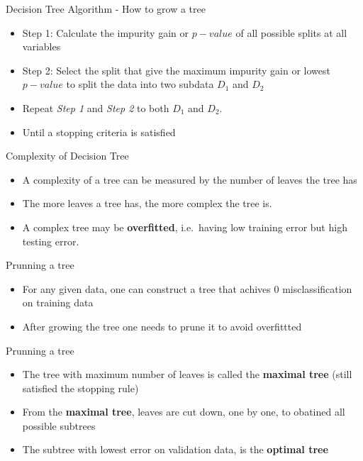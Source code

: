 \documentclass[
  ignorenonframetext,
]{beamer}
\providecommand{\tightlist}{%
  \setlength{\itemsep}{0pt}\setlength{\parskip}{0pt}}\usepackage{longtable,booktabs,array}
\begin{document}
\begin{frame}{Decision Tree Algorithm - How to grow a tree}
\label{decision-tree-algorithm---how-to-grow-a-tree}
\begin{itemize}
\tightlist
\item
  Step 1: Calculate the impurity gain or \(p-value\) of all possible
  splits at all variables
\item
  Step 2: Select the split that give the maximum impurity gain or lowest
  \(p-value\) to split the data into two subdata \(D_1\) and \(D_2\)
\item
  Repeat \emph{Step 1} and \emph{Step 2} to both \(D_1\) and \(D_2\).
\item
  Until a stopping criteria is satisfied
\end{itemize}
\end{frame}

\begin{frame}{Complexity of Decision Tree}
\label{complexity-of-decision-tree}
\begin{itemize}
\tightlist
\item
  A complexity of a tree can be measured by the number of leaves the
  tree has
\item
  The more leaves a tree has, the more complex the tree is.
\item
  A complex tree may be \textbf{overfitted}, i.e.~having low training
  error but high testing error.
\end{itemize}
\end{frame}

\begin{frame}{Prunning a tree}
\label{prunning-a-tree}
\begin{itemize}
\tightlist
\item
  For any given data, one can construct a tree that achives 0
  misclassification on training data
\item
  After growing the tree one needs to prune it to avoid overfittted
\end{itemize}
\end{frame}

\begin{frame}{Prunning a tree}
\label{prunning-a-tree-1}
\begin{itemize}
\tightlist
\item
  The tree with maximum number of leaves is called the \textbf{maximal
  tree} (still satisfied the stopping rule)
\item
  From the \textbf{maximal tree}, leaves are cut down, one by one, to
  obatined all possible subtrees
\item
  The subtree with lowest error on validation data, is the
  \textbf{optimal tree}
\end{itemize}
\end{frame}
\end{document}
